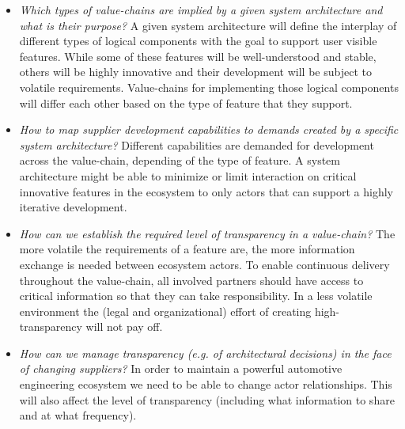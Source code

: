 \begin{itemize}
\item \emph{Which types of value-chains are implied by a given system architecture and what is their purpose?} A given system architecture will define the interplay of different types of logical components with the goal to support user visible features. 
While some of these features will be well-understood and stable, others will be highly innovative and their development will be subject to volatile requirements. 
Value-chains for implementing those logical components will differ each other based on the type of feature that they support. 

\item \emph{How to map supplier development capabilities to demands created by a specific system architecture?} Different capabilities are demanded for development across the value-chain, depending of the type of feature. 
A system architecture might be able to minimize or limit interaction on critical innovative features in the ecosystem to only actors that can support a highly iterative development. 


\item \emph{How can we establish the required level of transparency in a value-chain?} The more volatile the requirements of a feature are, the more information exchange is needed between ecosystem actors. 
To enable continuous delivery throughout the value-chain, all involved partners should have access to critical information so that they can take responsibility. 
In a less volatile environment the (legal and organizational) effort of creating high-transparency will not pay off. 

\item \emph{How can we manage transparency (e.g. of architectural decisions) in the face of changing suppliers?} In order to maintain a powerful automotive engineering ecosystem we need to be able to change actor relationships. This will also affect the level of transparency (including what information to share and at what frequency).
\end{itemize}


